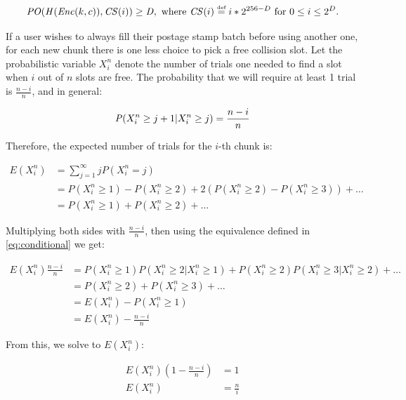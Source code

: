 \begin{equation}
\mathit{PO}(\mathit{H}(\mathit{Enc}(k, c)), \mathit{CS}(i))\geq\mathit{D},
\text{ where }\mathit{CS}(i)\overset{\textrm{\tiny def}}{=} i*2^{256-D}
\text{ for }0\leq i\leq  2^D.
\end{equation}

If a user wishes to always fill their postage stamp batch before using another one, for each new chunk there is one less choice to pick a free collision slot. Let the probabilistic variable $X^n_i$ denote  the number of trials one needed to find a slot when $i$ out of $n$ slots are free. The probability that we will require at least 1 trial is $\frac{n-i}{n}$, and in general:


\begin{equation}\label{eq:conditional}
\mathit{P}(X^n_i\geq j+1|X^n_i\geq j)=\frac{n-i}{n}\\
\end{equation}

Therefore, the expected number of trials for the $i$-th chunk is: 

 \begin{subequations}   \begin{align}
\mathit{E}(X^n_i)&=\sum^\infty_{j=1}j\mathit{P}(X^n_i=j)\\
&=\mathit{P}(X^n_i\geq 1)-\mathit{P}(X^n_i\geq 2)+2(\mathit{P}(X^n_i\geq 2)-P(X^n_i\geq 3))+\ldots\\
&= \mathit{P}(X^n_i\geq 1)+\mathit{P}(X^n_i\geq 2)+\ldots
\end{align} \end{subequations}

Multiplying both sides with $\frac{n-i}{n}$, then using  the equivalence defined in  \ref{eq:conditional} we get:

 \begin{subequations}   \begin{align}
\mathit{E}(X^n_i)\frac{n-i}{n}&=\mathit{P}(X^n_i\geq 1)\mathit{P}(X^n_i\geq 2|X^n_i\geq 1)+\mathit{P}(X^n_i\geq 2)\mathit{P}(X^n_i\geq 3|X^n_i\geq 2)+\ldots\\
&=\mathit{P}(X^n_i\geq 2)+\mathit{P}(X^n_i\geq 3)+\ldots\\
&=\mathit{E}(X^n_i)-\mathit{P}(X^n_i\geq 1)\\
&=\mathit{E}(X^n_i)-\frac{n-i}{n}
\end{align} \end{subequations}

From this, we solve to $\mathit{E}(X^n_i)$:

 \begin{subequations}   \begin{align}
\mathit{E}(X^n_i)(1-\frac{n-i}{n})&=1\\
\mathit{E}(X^n_i)&=\frac{n}{i}
\end{align} \end{subequations}

